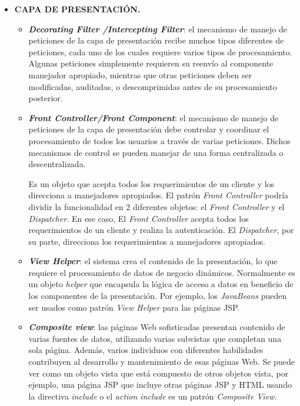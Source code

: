 \documentclass{memoria}
\begin{document}
\begin{itemize}
\item \textbf{CAPA DE PRESENTACIÓN.}

\begin{itemize}
\item \textbf{\textsl{Decorating Filter /Intercepting Filter}}: el mecanismo de manejo de peticiones de la capa de presentación recibe muchos tipos diferentes de peticiones, cada uno de los cuales requiere varios tipos de procesamiento. Algunas peticiones  simplemente requieren su reenvío al componente manejador apropiado, mientras que otras peticiones deben ser modificadas, auditadas, o descomprimidas antes de su procesamiento posterior.

\item \textbf{\textsl{Front Controller/Front Component}}: el mecanismo de manejo de peticiones de la capa de presentación debe controlar y coordinar el procesamiento de todos los usuarios a través de varias peticiones. Dichos mecanismos de control se  pueden manejar de una forma centralizada o descentralizada. 
 
Es un objeto que acepta todos los requerimientos de un cliente y los direcciona a manejadores apropiados. El patrón \textsl{Front Controller} podría dividir la funcionalidad en 2 diferentes objetos: el \textsl{Front Controller} y el \textsl{Dispatcher}. En ese caso, El \textsl{Front Controller} acepta todos los requerimientos de un cliente y realiza la autenticación. El \textsl{Dispatcher}, por su parte, direcciona los requerimientos a manejadores apropiados.

\item \textbf{\textsl{View Helper}}: el sistema crea el contenido de la presentación, lo que requiere el procesamiento de datos de negocio dinámicos. Normalmente es un objeto \textsl{helper} que encapsula la lógica de acceso a datos en beneficio de los componentes de la presentación. Por ejemplo, los \textsl{JavaBeans} pueden ser usados como patrón \textsl{View Helper} para las páginas JSP.

\item \textbf{\textsl{Composite view}}: las páginas Web sofisticadas presentan contenido de varias fuentes de datos, utilizando varias subvistas que completan una sola página. Además, varios individuos con diferentes habilidades contribuyen al desarrollo y mantenimiento de esas páginas Web. Se puede ver como un objeto vista que está compuesto de otros objetos vista, por ejemplo, una página JSP que incluye otras páginas JSP y HTML usando la directiva \textsl{include} o el \textsl{action include} es un patrón \textsl{Composite View}.


\end{itemize}
\end{itemize}
\end{document}
